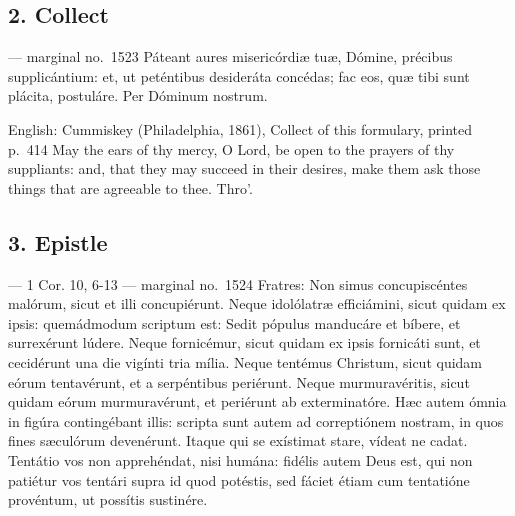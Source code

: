\elementguard
\subsection*{2. Collect }

\begin{appointedlatin}{ --- marginal no.\ 1523}
Páteant aures misericórdiæ tuæ, Dómine, précibus supplicántium: et, ut
peténtibus desideráta concédas; fac eos, quæ tibi sunt plácita, postuláre. Per
Dóminum nostrum.
\end{appointedlatin}

\begin{namedtranslation}{English: Cummiskey (Philadelphia, 1861), Collect of this formulary, printed p.~414}
May the ears of thy mercy, O Lord, be open to the prayers of thy suppliants:
and, that they may succeed in their desires, make them ask those things that
are agreeable to thee. Thro'.
\end{namedtranslation}


\elementguard
\subsection*{3. Epistle }

\begin{appointedlatin}{ --- 1 Cor. 10, 6-13 --- marginal no.\ 1524}
Fratres: Non simus concupiscéntes malórum, sicut et illi concupiérunt. Neque
idolólatræ efficiámini, sicut quidam ex ipsis: quemádmodum scriptum est: Sedit
pópulus manducáre et bíbere, et surrexérunt lúdere. Neque fornicémur, sicut
quidam ex ipsis fornicáti sunt, et cecidérunt una die vigínti tria mília.
Neque tentémus Christum, sicut quidam eórum tentavérunt, et a serpéntibus
periérunt. Neque murmuravéritis, sicut quidam eórum murmuravérunt, et
periérunt ab exterminatóre. Hæc autem ómnia in figúra contingébant illis:
scripta sunt autem ad correptiónem nostram, in quos fines sæculórum
devenérunt. Itaque qui se exístimat stare, vídeat ne cadat. Tentátio vos non
apprehéndat, nisi humána: fidélis autem Deus est, qui non patiétur vos tentári
supra id quod potéstis, sed fáciet étiam cum tentatióne provéntum, ut possítis
sustinére.
\end{appointedlatin}

